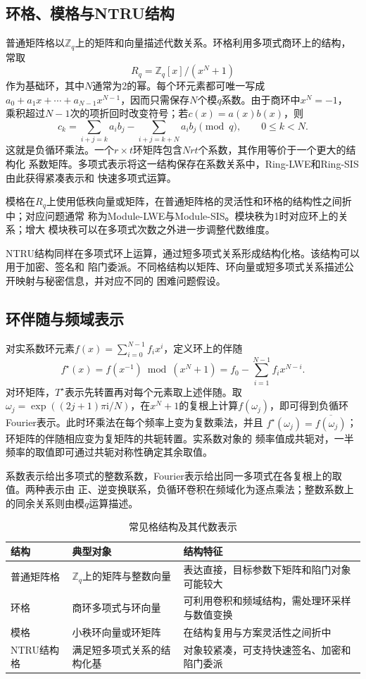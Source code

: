 \begin{mathchapterlayout}
\subsection{环格、模格与NTRU结构}

普通矩阵格以$\mathbb Z_q$上的矩阵和向量描述代数关系。环格利用多项式商环上的结构，常取
\[
 R_q=\mathbb Z_q[x]/(x^N+1)
\]
作为基础环，其中$N$通常为2的幂。每个环元素都可唯一写成
$a_0+a_1x+\cdots+a_{N-1}x^{N-1}$，因而只需保存$N$个模$q$系数。由于商环中$x^N=-1$，
乘积超过$N-1$次的项折回时改变符号；若$c(x)=a(x)b(x)$，则
\[
 c_k=\sum_{i+j=k}a_i b_j-\sum_{i+j=k+N}a_i b_j\pmod q,
 \qquad 0\leq k<N.
\]
这就是负循环乘法。一个$r\times t$环矩阵包含$Nrt$个系数，其作用等价于一个更大的结构化
系数矩阵。多项式表示将这一结构保存在系数关系中，Ring-LWE和Ring-SIS由此获得紧凑表示和
快速多项式运算\cite{lpr2013ring}。

模格在$R_q$上使用低秩向量或矩阵，在普通矩阵格的灵活性和环格的结构性之间折中；对应问题通常
称为Module-LWE与Module-SIS\cite{langlois2015module}。模块秩为1时对应环上的关系；增大
模块秩可以在多项式次数之外进一步调整代数维度。

NTRU结构同样在多项式环上运算，通过短多项式关系形成结构化格。该结构可以用于加密、签名和
陷门委派。不同格结构以矩阵、环向量或短多项式关系描述公开映射与秘密信息，并对应不同的
困难问题假设。

\subsection{环伴随与频域表示}

对实系数环元素$f(x)=\sum_{i=0}^{N-1}f_i x^i$，定义环上的伴随
\[
 f^\star(x)=f(x^{-1})\bmod(x^N+1)
 =f_0-\sum_{i=1}^{N-1}f_i x^{N-i}.
\]
对环矩阵，$T^\star$表示先转置再对每个元素取上述伴随。取
$\omega_j=\exp((2j+1)\pi\mathrm i/N)$，在$x^N+1$的复根上计算$f(\omega_j)$，即可得到负循环
Fourier表示。此时环乘法在每个频率上变为复数乘法，并且
$f^\star(\omega_j)=\overline{f(\omega_j)}$；环矩阵的伴随相应变为复矩阵的共轭转置。实系数对象的
频率值成共轭对，一半频率的取值即可通过共轭对称性确定其余取值。

系数表示给出多项式的整数系数，Fourier表示给出同一多项式在各复根上的取值。两种表示由
正、逆变换联系，负循环卷积在频域化为逐点乘法；整数系数上的同余关系则由模$q$运算描述。

\begin{table}[H]
\centering\small
\caption{常见格结构及其代数表示}
\label{tab:lattice-families}
\begin{tabularx}{\textwidth}{@{}p{}p{}X@{}}
\toprule
\rowcolor{black!8} 结构 & 典型对象 & 结构特征 \\
\midrule
普通矩阵格 & $\mathbb Z_q$上的矩阵与整数向量 & 表达直接，目标参数下矩阵和陷门对象可能较大 \\
环格 & 商环多项式与环向量 & 可利用卷积和频域结构，需处理环采样与数值变换 \\
模格 & 小秩环向量或环矩阵 & 在结构复用与方案灵活性之间折中 \\
NTRU结构格 & 满足短多项式关系的结构化基 & 对象较紧凑，可支持快速签名、加密和陷门委派 \\
\bottomrule
\end{tabularx}
\end{table}


\end{mathchapterlayout}
